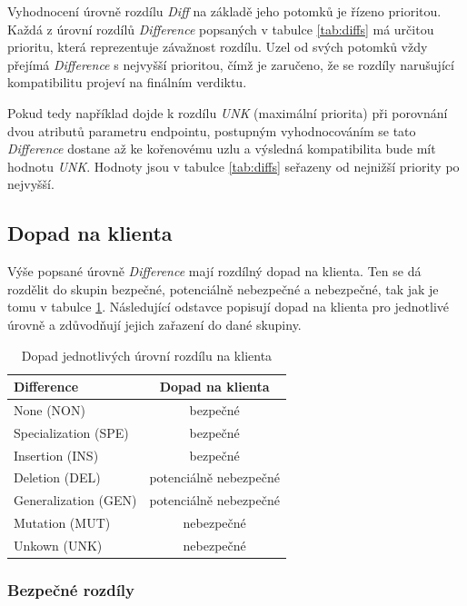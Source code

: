 \documentclass[czech,DP]{thesiskiv}
\begin{document}
Vyhodnocení úrovně rozdílu \textit{Diff} na základě jeho potomků je řízeno prioritou. Každá z úrovní rozdílů \textit{Difference} popsaných v tabulce \ref{tab:diffs} má určitou prioritu, která reprezentuje závažnost rozdílu. Uzel od svých potomků vždy přejímá \textit{Difference} s nejvyšší prioritou, čímž je zaručeno, že se rozdíly narušující kompatibilitu projeví na finálním verdiktu.

Pokud tedy například dojde k rozdílu \textit{UNK} (maximální priorita) při porovnání dvou atributů parametru endpointu, postupným vyhodnocováním se tato \textit{Difference} dostane až ke kořenovému uzlu a výsledná kompatibilita bude mít hodnotu \textit{UNK}. Hodnoty jsou v tabulce \ref{tab:diffs} seřazeny od nejnižší priority po nejvyšší.


\subsection{Dopad na klienta}

Výše popsané úrovně \textit{Difference} mají rozdílný dopad na klienta. Ten se dá rozdělit do skupin bezpečné, potenciálně nebezpečné a nebezpečné, tak jak je tomu v tabulce \ref{tab:diff-level}. Následující odstavce popisují dopad na klienta pro jednotlivé úrovně a zdůvodňují jejich zařazení do dané skupiny.

\begin{table}[h!]
	\centering
	\begin{tabular}{|l|c|}
		\hline
		Difference & Dopad na klienta  \\
		\hline
		\hline
		None (NON) & bezpečné \\
		\hline
		Specialization (SPE) & bezpečné  \\
		\hline
		Insertion (INS) & bezpečné \\
		\hline
		Deletion (DEL) & potenciálně nebezpečné \\
		\hline
		Generalization (GEN) & potenciálně nebezpečné \\
		\hline
		Mutation (MUT) & nebezpečné \\
		\hline
		Unkown (UNK) & nebezpečné \\
		\hline
	\end{tabular}
	\caption{Dopad jednotlivých úrovní rozdílu na klienta }
	\label{tab:diff-level}
\end{table}

\subsubsection{Bezpečné rozdíly}
\end{document}
